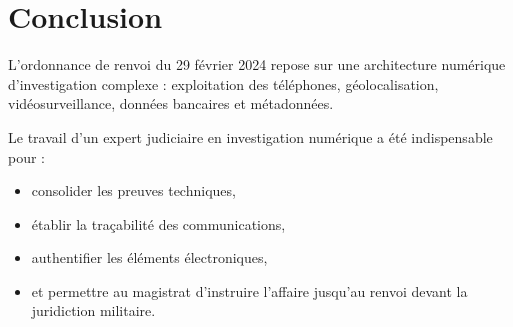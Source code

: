 \documentclass[12pt,a4paper]{article}
\begin{document}
\section{Conclusion}
L’ordonnance de renvoi du 29 février 2024 repose sur une architecture numérique d’investigation complexe : exploitation des téléphones, géolocalisation, vidéosurveillance, données bancaires et métadonnées. 

Le travail d’un expert judiciaire en investigation numérique a été indispensable pour :
\begin{itemize}
\item consolider les preuves techniques,
\item établir la traçabilité des communications,
\item authentifier les éléments électroniques,
\item et permettre au magistrat d’instruire l’affaire jusqu’au renvoi devant la juridiction militaire.
\end{itemize}
\end{document}
